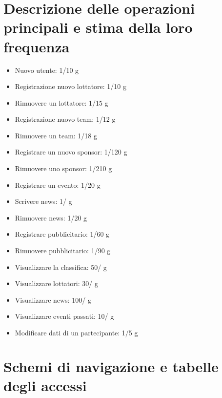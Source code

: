 \documentclass[a4paper,12pt]{report}
\begin{document}
\section{Descrizione delle operazioni principali e stima della loro frequenza}
\begin{itemize}
    \item Nuovo utente: 1/10 g
    \item Registrazione nuovo lottatore: 1/10 g
    \item Rimuovere un lottatore: 1/15 g
    \item Registrazione nuovo team: 1/12 g
    \item Rimuovere un team: 1/18 g
    \item Registrare un nuovo sponsor: 1/120 g
    \item Rimuovere uno sponsor: 1/210 g
    \item Registrare un evento: 1/20 g
    \item Scrivere news: 1/ g
    \item Rimuovere news: 1/20 g
    \item Registrare pubblicitario: 1/60 g
    \item Rimuovere pubblicitario: 1/90 g
    \item Visualizzare la classifica: 50/ g
    \item Visualizzare lottatori: 30/ g
    \item Visualizzare news: 100/ g
    \item Visualizzare eventi passati: 10/ g
    \item Modificare dati di un partecipante: 1/5 g
\end{itemize} 

\section{Schemi di navigazione e tabelle degli accessi}
\end{document}
